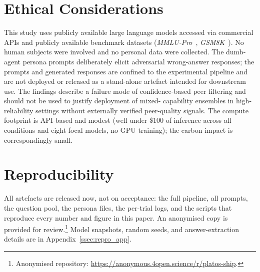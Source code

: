 \documentclass[11pt]{article}
\begin{document}
\section*{Ethical Considerations}
\label{sec:ethics}

This study uses publicly available large language models accessed via
commercial APIs and publicly available benchmark datasets
(\textit{MMLU-Pro}~\citep{wang2024mmlupro},
\textit{GSM8K}~\citep{cobbe2021training}).
No human subjects were involved and no personal data were collected.
The dumb-agent persona prompts deliberately elicit adversarial
wrong-answer responses; the prompts and generated responses are
confined to the experimental pipeline and are not deployed or released
as a stand-alone artefact intended for downstream use.
The findings describe a failure mode of confidence-based peer
filtering and should not be used to justify deployment of mixed-
capability ensembles in high-reliability settings without externally
verified peer-quality signals.
The compute footprint is API-based and modest (well under \$100 of
inference across all conditions and eight focal models, no GPU training);
the carbon impact is correspondingly small.

\section*{Reproducibility}
\label{sec:repro}

All artefacts are released now, not on acceptance: the full pipeline, all
prompts, the question pool, the persona files, the per-trial logs, and the
scripts that reproduce every number and figure in this paper.
An anonymised copy is provided for review.\footnote{Anonymised repository:
\url{https://anonymous.4open.science/r/platos-ship}.}
Model snapshots, random seeds, and answer-extraction details are in
Appendix~\ref{ssec:repro_app}.

%
\end{document}
